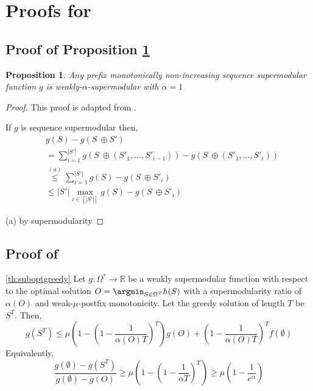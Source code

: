 \documentclass{article} %
\newtheorem{proposition}[theorem]{Proposition}
\begin{document}
\section{Proofs for } \label{sec:proofgreedy}

\subsection{Proof of Proposition \ref{th:alpha=1}} \label{sec:proofalpha=1}

\begin{proposition} \label{th:alpha=1}
    Any prefix monotonically non-increasing sequence supermodular function $g$ is weakly-$\alpha$-supermodular with $\alpha = 1$
\end{proposition}

\begin{proof}

This proof is adapted from \citet{liberty2017greedy}.

If $g$ is sequence supermodular then,
\begin{align*}
    &g(S) - g(S \ \oplus S' ) \\
    &= \sum_{i = 1}^{|S'|} g(S \ \oplus \left(S'_1, \dots, S'_{i - 1}\right)) - g(S \ \oplus \left(S'_1, \dots, S'_{i}\right)) \\
    &\overset{(a)}{\leq} \sum_{i = 1}^{|S'|} g(S) - g(S \ \oplus  S'_{i}) \\
    &\leq |S'|\max_{i \in [|S'|]} g(S) - g(S \ \oplus  S'_{i})
\end{align*}

(a) by supermodularity


\end{proof}

\subsection{Proof of } \label{sec:proofsuboptgreedy}



\begin{customtheorem}{\ref{th:suboptgreedy}}
    Let $g: \Omega^* \to \mathbb{R}$ be a weakly supermodular function with respect to the optimal solution $O = \argmin_{S \in \Omega^T} h(S)$ with a supermodularity ratio of $\alpha(O)$ and weak-$\mu$-postfix monotonicity. Let the greedy solution of length $T$ be $S^T$. Then,
    \begin{equation*}
        g(S^T) \leq  \mu\left(1 - \left(1 - \frac{1}{\alpha(O) T}\right)^T\right)
        g(O) +  \left(1 - \frac{1}{\alpha(O) T}\right)^Tf(\emptyset)
    \end{equation*}
    Equivalently, 
    \begin{equation*}
        \frac{g(\emptyset) - g(S^T)}{g(\emptyset) - g(O)} \geq \mu\left(1 - \left(1 - \frac{1}{\alpha T}\right)^T\right) \geq \mu\left(1 - \frac{1}{e^{\alpha}}\right)
    \end{equation*}
\end{customtheorem}
\end{document}
